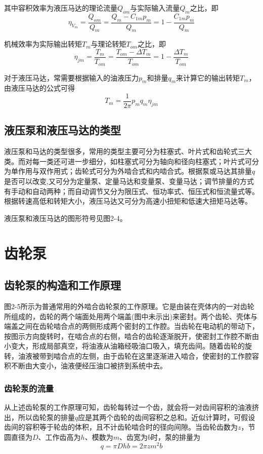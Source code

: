 其中容积效率为液压马达的理论流量$Q_{om}$与实际输入流量$Q_{m}$之比，即
\begin{equation}
  \eta_{V_{m}}=\frac{Q_{om}}{Q_{m}}=\frac{Q_{m}-C_{1m}p_{m}}{Q_{m}}=1-\frac{C_{1m}p_{m}}{Q_{m}}
\end{equation}

机械效率为实际输出转矩$T_{m}$与理论转矩$T_{om}$之比，即
\begin{equation}
  \eta_{jm}=\frac{T_{m}}{T_{om}}=\frac{T_{om}-{\Delta T_{m}}}{T_{om}}=1-\frac{\Delta T_{m}}{T_{om}}
\end{equation}

对于液压马达，常需要根据输入的油液压力$p_{m}$和排量$q_{m}$来计算它的输出转矩$T_{m}$，由液压马达的公式可得
\begin{equation}
  T_{m}=\frac{1}{2\pi}p_{m}q_{m}\eta_{jm}
\end{equation}

\subsection{液压泵和液压马达的类型}
液压泵和马达的类型很多，常用的类型主要可分为柱塞式、叶片式和齿轮式三大类。而对每一类还可进一步细分，如柱塞式可分为轴向和径向柱塞式；叶片式可分为单作用与双作用式；齿轮式可分为外啮合式和内啮合式。根据泵或马达其排量$q$是否可以改变,又可分为定量泵、定量马达和变量泵、变量马达；调节排量的方式有手动和自动两种；而自动调节又分为限压式、恒功率式、恒压式和恒流量式等。根据转速高低和转矩大小，液压马达又可分为高速小扭矩和低速大扭矩马达等。


液压泵和液压马达的图形符号见图2-4。


\section{齿轮泵}
\subsection{齿轮泵的构造和工作原理}
图2-5所示为普通常用的外啮合齿轮泵的工作原理。它是由装在壳体内的一对齿轮所组成的，齿轮的两个端面处用两个端盖(图中未示出)来密封。两个齿轮、壳体与端盖之间在齿轮啮合点的两侧形成两个密封的工作腔。当齿轮在电动机的带动下，按图示方向旋转时，在啮合点的右侧，啮合的齿轮逐渐脱开，使密封工作腔不断由小变大，形成局部真空，将油液从油箱经吸油口吸入，填充齿间。随着齿轮的旋转，油液被带到啮合点的左侧，由于齿轮在这里逐渐进入啮合，使密封的工作腔容积不断由大变小，油液便经压油口被挤到系统中去。
\subsubsection{齿轮泵的流量}
从上述齿轮泵的工作原理可知，齿轮每转过一个齿，就会将一对齿间容积的油液挤出，所以齿轮泵的排量$q$应是其两个齿轮的齿间容积之总和。近似计算时，可假设齿间的容积等于轮齿的体积，且不计齿轮啮合时的径向间隙。当齿轮齿数为$z$，节圆直径为$D$、工作齿高为$h$、模数为$m$、齿宽为$b$时，泵的排量为
\begin{equation}
  q=\pi D h b=2\pi z m^2 b
\end{equation}

